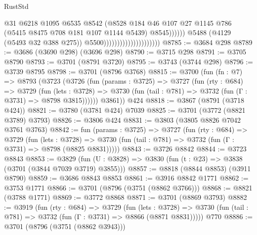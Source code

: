 \begin{lexlean}{RustStd}
\begin{coremodule}
                                                        @31
                                                        @6218
                                                        @1095
                                                        @6535
                                                        @8542
                                                        (@8528
                                                          @184
                                                          @46
                                                          @107
                                                          @27
                                                          @1145
                                                          @786
                                                          (@5415 @8475 @708 @181 @107 @1144 @5439)
                                                          @8545))))))
                                              @5488
                                              (@4129 (@5493 @32 @388 @275))
                                              @5500)))))))))))))))))))))
@8785 := @3684 @298
@8789 := @3686 (@3690 @298) (@3696 @298)
@8790 := @3715 @298
@8791 := @3705 @8790
@8793 := @3701 (@8791 @3720)
@8795 := @3743 (@3744 @298)
@8796 := @3739 @8795
@8798 := @3701 (@8796 @3768)
@8815 := @3700
    (fun (fn : @7) =>
    @8793
      (@3723
        (@3726
          (fun (params : @3725) =>
          @3727
            (fun (rty : @684) =>
            @3729
              (fun (lets : @3728) =>
              @3730 (fun (tail : @781) => @3732 (fun (Γ : @3731) => @8798 @3815))))))
        @3861))
    @424
@8818 := @3867 (@8791 (@3718 @424))
@8821 := @3780 (@3781 @424) @7039
@8825 := @3701 (@3772 (@8821 @3789) @3793)
@8826 := @3806 @424
@8831 := @3803 (@3805 @8826 @7042 @3761 @3763)
@8842 := fun (params : @3725) =>
  @3727
    (fun (rty : @684) =>
    @3729
      (fun (lets : @3728) =>
      @3730 (fun (tail : @781) => @3732 (fun (Γ : @3731) => @8798 (@8825 @8831)))))
@8843 := @3726 @8842
@8844 := @3723 @8843
@8853 := @3829 (fun (U : @3828) => @3830 (fun (t : @23) => @3838 (@3701 (@3844 @7039 @3719) @3855)))
@8857 := @8818 (@8844 @8853) (@3911 @8790)
@8859 := @3686 @8843 @8853
@8861 := @3916 @8842 @1771
@8862 := @3753 @1771
@8866 := @3701 (@8796 (@3751 (@8862 @3766)))
@8868 := @8821 (@3788 @1771)
@8869 := @3772 @8868
@8871 := @3701 (@8869 @3793)
@8882 := @3919
    (fun (rty : @684) =>
    @3729
      (fun (lets : @3728) =>
      @3730 (fun (tail : @781) => @3732 (fun (Γ : @3731) => @8866 (@8871 @8831)))))
    @770
@8886 := @3701 (@8796 (@3751 (@8862 @3943)))

\end{coremodule}
\end{lexlean}
